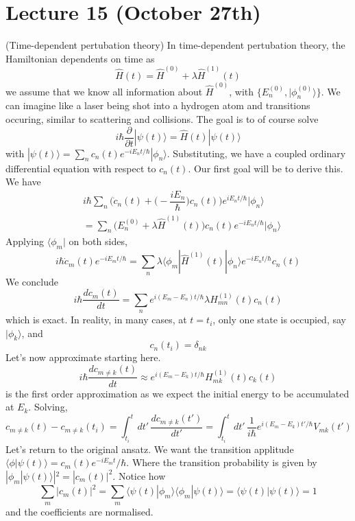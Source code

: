 \section{Lecture 15 (October 27th)}
\begin{defi}
(Time-dependent pertubation theory) In time-dependent pertubation theory, the Hamiltonian dependents on time as
\[\hat{H}(t)=\hat{H}^{(0)}+\lambda \hat{H}^{(1)}(t)\]
we assume that we know all information about $\hat{H}^{(0)}$, with $\{E^{(0)}_{n},|\phi  _{n}^{(0)}\rangle \}$. We can imagine like a laser being shot into a hydrogen atom and transitions occuring, similar to scattering and collisions. The goal is to of course solve
\[i\hbar \dfrac{\partial }{\partial t}|\psi (t)\rangle =\hat{H}(t)|\psi (t)\rangle \]
with $|\psi (t)\rangle =\sum _{n}c_{n}(t)e^{-iE_{n}t/\hbar }|\phi _{n}\rangle $. Substituting, we have a coupled ordinary differential equation with respect to $c_{n}(t)$. Our first goal will be to derive this. We have
\[\begin{align*}
&i\hbar \sum _{n}\Big(\dot{c}_{n}(t)+\Big(-\dfrac{iE_{n}}{\hbar }\Big)c_{n}(t)\Big)e^{iE_{n}t/\hbar }|\phi _{n}\rangle \\
&=\sum _{n}\Big(E^{(0)}_{n}+\lambda \hat{H}^{(1)}(t)\Big)c_{n}(t)e^{-iE_{n}t/\hbar }|\phi_{n} \rangle 
\end{align*}\]
Applying $\langle \phi _{m}|$ on both sides, 
\[i\hbar \dot{c}_{m}(t)e^{-iE_{m}t/\hbar }=\sum _{n}\lambda \langle \phi _{m}|\hat{H}^{(1)}(t)|\phi _{n}\rangle e^{-iE_{n}t/\hbar }c_{n}(t)\]
We conclude
\[i\hbar \dfrac{d c_{m}(t)}{d t}=\sum _{n}e^{i(E_{m}-E_{n})t/\hbar }\lambda H^{(1)}_{mn}(t)c_{n}(t) \]
which is exact. In reality, in many cases, at $t=t_{i}$, only one state is occupied, say $|\phi _{k}\rangle $, and 
\[c_{n}(t_{i})=\delta _{nk}\]
Let's now approximate starting here. 
\[i\hbar \dfrac{d c_{m\ne k}(t)}{d t}\approx e^{i(E_{m}-E_{k})t/\hbar }H^{(1)}_{mk}(t)c_{k}(t) \]
is the first order approximation as we expect the initial energy to be accumulated at $E_{k}$. Solving,
\[c_{m\ne k}(t)-c_{m\ne k}(t_i)=\int ^{t}_{t_{i}}dt'\,\dfrac{d c_{m\ne k}(t')}{d t'} =\int ^{t}_{t_{i}}dt'\,\dfrac{1}{i\hbar }e^{i(E_{m}-E_{k})t'/\hbar }V_{mk}(t')\]
Let's return to the original ansatz. We want the transition applitude $\langle \phi |\psi (t)\rangle =c_{m}(t)e^{-iE_{m}t}/\hbar $. Where the transition probability is given by $|\phi _{m}|\psi (t)\rangle |^2=|c_{m}(t)|^2$. Notice how
\[\sum _{m}|c_{m}(t)|^2=\sum _{m}\langle \psi (t)|\phi _{m}\rangle \langle \phi _{m}|\psi (t)\rangle =\langle \psi (t)|\psi (t)\rangle =1\]
and the coefficients are normalised. 
\end{defi}
